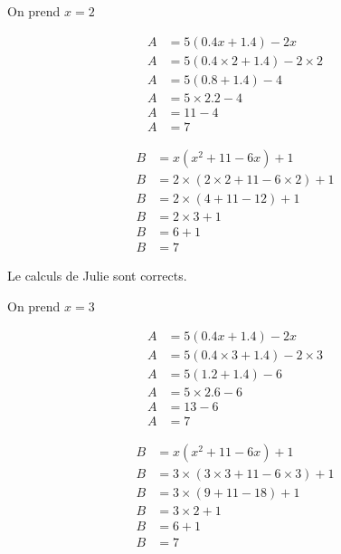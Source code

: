 \documentclass[12pt,a4paper]{article}
\begin{document}
\vspace*{1cm}

\newpage
On prend $x=2$


\begin{multicols}{2}
	\begin{align*}
	A &= 5(\num{0.4}x + \num{1.4}) - 2x\\
	A &= 5(\num{0.4}\times 2 + \num{1.4}) - 2 \times 2\\
	A &= 5(\num{0.8} + \num{1.4}) - 4 \\
	A &= 5 \times \num{2.2} - 4 \\
	A &= 11 - 4 \\
	A &= 7 
	\end{align*}
	
	\begin{align*}
	B &= x(x^2 + 11 - 6x) + 1\\
	B &= 2 \times (2 \times 2 + 11 - 6 \times 2) + 1 \\
	B &= 2 \times (4 + 11 - 12) + 1 \\
	B &= 2 \times 3 + 1 \\
	B &= 6+1 \\
	B &= 7 
	\end{align*}	
\end{multicols}

Le calculs de Julie sont corrects.


\vspace*{1cm}


On prend $x=3$


\begin{multicols}{2}
	\begin{align*}
	A &= 5(\num{0.4}x + \num{1.4}) - 2x\\
	A &= 5(\num{0.4}\times 3 + \num{1.4}) - 2 \times 3\\
	A &= 5(\num{1.2} + \num{1.4}) - 6 \\
	A &= 5 \times \num{2.6} - 6 \\
	A &= 13 - 6 \\
	A &= 7 
	\end{align*}
	
	\begin{align*}
	B &= x(x^2 + 11 - 6x) + 1\\
	B &= 3 \times (3 \times 3 + 11 - 6 \times 3) + 1 \\
	B &= 3 \times (9 + 11 - 18) + 1 \\
	B &= 3 \times 2 + 1 \\
	B &= 6+1 \\
	B &= 7 \\
	\end{align*}	
\end{multicols}
\end{document}
